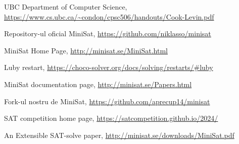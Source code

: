 \documentclass{llncs}
\begin{document}
%
%
%
% 
% 
%
\begin{thebibliography}{8}
UBC Department of Computer Science, \url{https://www.cs.ubc.ca/~condon/cpsc506/handouts/Cook-Levin.pdf}

Repository-ul oficial MiniSat, \url{https://github.com/niklasso/minisat}

MiniSat Home Page, \url{http://minisat.se/MiniSat.html}

Luby restart, \url{https://choco-solver.org/docs/solving/restarts/#luby}

MiniSat documentation page, \url{http://minisat.se/Papers.html}

Fork-ul nostru de MiniSat, \url{https://github.com/aprecup14/minisat}

SAT competition home page, \url{https://satcompetition.github.io/2024/}

An Extensible SAT-solve paper, \url{http://minisat.se/downloads/MiniSat.pdf}




\end{thebibliography}
\end{document}
